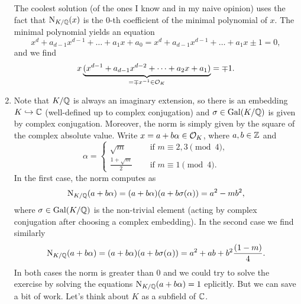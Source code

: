 \documentclass[a4paper,11pt]{article}
\begin{document}
\begin{enumerate}
        The coolest solution (of the ones I know and in my naive opinion) uses the fact that
        $\operatorname{N}_{K/\mathbb{Q}}(x)$ is the $0$-th coefficient of the minimal polynomial of
        $x$. The minimal polynomial yields an equation
        \begin{equation*}
            x^d + a_{d-1}x^{d-1} + \dots + a_1 x + a_0 = x^d + a_{d-1}x^{d-1} + \dots + a_1 x \pm 1 = 0,
        \end{equation*}
        and we find
        \begin{equation*}
            x\underbrace{(x^{d-1} + a_{d-1}x^{d-2} + \dots + a_2 x + a_1)}_{= \mp x^{-1} \in \mathcal{O}_K} = \mp 1.
        \end{equation*}
    \item 
        Note that $K/\mathbb{Q}$ is always an imaginary extension, so there is an
        embedding $K \hookrightarrow \mathbb{C}$ (well-defined up to complex conjugation) and
        $\sigma \in \operatorname{Gal}(K/\mathbb{Q})$ is given by complex conjugation. Moreover,
        the norm is simply given by the square of
        the complex absolute value.
        Write $x = a + b \alpha \in \mathcal{O}_K$, where $a, b \in \mathbb{Z}$ and 
        \begin{equation*}
            \alpha =    \begin{cases}
                            \sqrt m \quad &\text{ if } m \equiv 2,3 \pmod 4, \\
                            \frac{1+\sqrt m}2 \quad &\text{ if } m \equiv 1 \pmod 4.
                        \end{cases}
        \end{equation*}
        In the first case, the norm computes as
        \begin{equation*}
             \operatorname{N}_{K/\mathbb{Q}} (a + b \alpha) = (a + b \alpha)(a + b
            \sigma(\alpha)) =  a^2 - mb^2,
        \end{equation*}
        where $\sigma \in \operatorname{Gal}({K/\mathbb{Q}})$ is the non-trivial element (acting by 
        complex conjugation after choosing a complex embedding).
        In the second case we find similarly
        \begin{equation*}
             \operatorname{N}_{K/\mathbb{Q}} (a + b \alpha) = (a + b \alpha)(a + b
            \sigma(\alpha)) =  a^2 + ab + b^2 \frac{(1-m)}4.
        \end{equation*}
        In both cases the norm is greater than $0$ and we could try to solve
        the exercise by solving the equations
        $\operatorname{N}_{K/\mathbb{Q}}(a + b\alpha) = 1$ eplicitly. But we can save a bit of work. Let's
        think about $K$ as a subfield of $\mathbb{C}$.

\end{enumerate}
\end{document}
